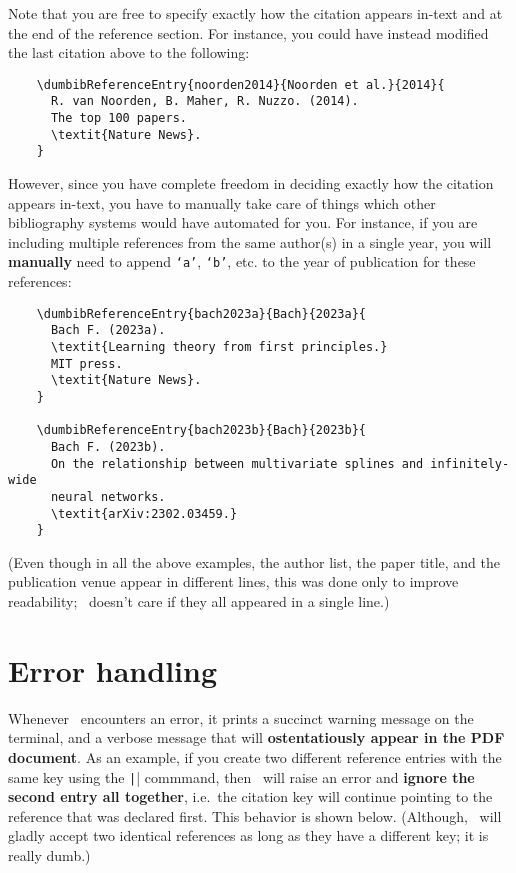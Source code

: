 \documentclass[letter, 12pt]{article}
\begin{document}
  Note that you are free to specify exactly how the citation appears in-text and at the end of the reference section. For instance, you could have instead modified the last citation above to the following:
  \begin{verbatim}
    \dumbibReferenceEntry{noorden2014}{Noorden et al.}{2014}{
      R. van Noorden, B. Maher, R. Nuzzo. (2014).
      The top 100 papers.
      \textit{Nature News}.
    }
  \end{verbatim}
  However, since you have complete freedom in deciding exactly how the citation appears in-text, you have to manually take care of things which other bibliography systems would have automated for you. For instance, if you are including multiple references from the same author(s) in a single year, you will \textbf{manually} need to append \texttt{`a'}, \texttt{`b'}, etc. to the year of publication for these references:
  \begin{verbatim}
    \dumbibReferenceEntry{bach2023a}{Bach}{2023a}{
      Bach F. (2023a).
      \textit{Learning theory from first principles.}
      MIT press.
      \textit{Nature News}.
    }
    
    \dumbibReferenceEntry{bach2023b}{Bach}{2023b}{
      Bach F. (2023b).
      On the relationship between multivariate splines and infinitely-wide
      neural networks.
      \textit{arXiv:2302.03459.}
    }
  \end{verbatim}

  

  (Even though in all the above examples, the author list, the paper title, and the publication venue appear in different lines, this was done only to improve readability; \dumbib\ doesn't care if they all appeared in a single line.) 
  
  \section{Error handling}
  Whenever \dumbib\ encounters an error, it prints a succinct warning message on the terminal, and a verbose message that will \textbf{ostentatiously appear in the PDF document}. As an example, if you create two different reference entries with the same key using the \texttt|\dumbibReferenceEntry{}| commmand, then \dumbib\ will raise an error and \textbf{ignore the second entry all together}, i.e.\ the citation key will continue pointing to the reference that was declared first. This behavior is shown below. (Although, \dumbib\ will gladly accept two identical references as long as they have a different key; it is really dumb.)
\end{document}
